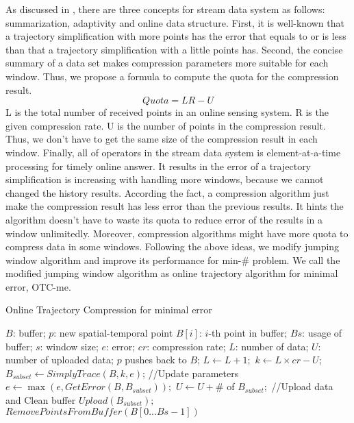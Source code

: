 \documentclass[12pt]{article}
\begin{document}
\begin{CJK}{UTF8}{bsmi}
As discussed in \cite{2001:DSMS}, there are three concepts for stream data system as follows: summarization, adaptivity and online data structure. First, it is well-known that a trajectory simplification with more points has the error that equals to or is less than that a trajectory simplification with a little points has. Second, the concise summary of a data set makes compression parameters more suitable for each window. Thus, we propose a formula to compute the quota for the compression result. 
  \[ Quota = LR-U \]
  L is the total number of received points in an online sensing system. R is the given compression rate. U is the number of points in the compression result. Thus, we don't have to get the same size of the compression result in each window. Finally, all of operators in the stream data system is element-at-a-time processing for timely online answer. It results in the error of a trajectory simplification is increasing with handling more windows, because we cannot changed the history results. According the fact, a compression algorithm just make the compression result has less error than the previous results. It hints the algorithm doesn't have to waste its quota to reduce error of the results in a window unlimitedly. Moreover, compression algorithms might have more quota to compress data in some windows. Following the above ideas, we modify jumping window algorithm and improve its performance for min-\# problem. We call the modified jumping window algorithm as online trajectory algorithm for minimal error, OTC-me.




\begin{algorithm}[h]
  \caption{Online Trajectory Compression for minimal error}
  \label{code:OTCme}
  \begin{algorithmic}[1]
  \Require
   	  $B$: buffer;
	  $p$: new spatial-temporal point
      $B[i]$: $i$-th point in buffer;
      $Bs$: usage of buffer;
      $s$: window size;
      $e$: error;
      $cr$: compression rate;
      $L$: number of data;
      $U$: number of uploaded data;
   \Ensure
   	\State $p$ pushes back to $B$;
	\State $L \gets L+1 ;$
		\State $k \gets L \times cr - U;$
		\State $B_{subset} \gets SimplyTrace(B,k,e)$;
		\State //Update parameters
		\State $e \gets \max (e, GetError(B,B_{subset}));$
		\State $U \gets U + \#$ of $B_{subset};$
		\State //Upload data and Clean buffer
		\State $Upload(B_{subset});$
		\State $RemovePointsFromBuffer(B[0 ... Bs-1])$
    \EndIf
  \end{algorithmic}
\end{algorithm}





\end{CJK}
\end{document}
